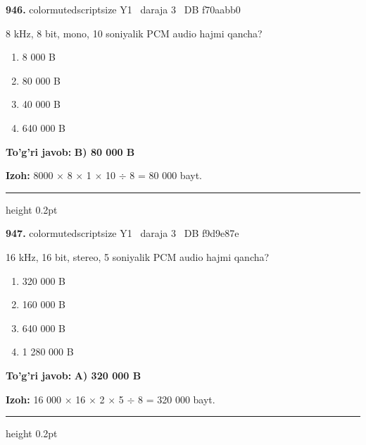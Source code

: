 \documentclass[10pt,a4paper,oneside]{article}
\begin{document}
\noindent\textbf{\color{ink}946.}  {color{muted}scriptsize Y1 \textbullet\ daraja 3 \textbullet\ DB f70aabb0}
\par
8 kHz, 8 bit, mono, 10 soniyalik PCM audio hajmi qancha?
\begin{enumerate}[label=\Alph*),leftmargin=9mm]
\item 8 000 B
\item 80 000 B
\item 40 000 B
\item 640 000 B
\end{enumerate}
\begin{tcolorbox}[enhanced,breakable,colback=teal!4,colframe=teal!50!black,boxrule=0.5pt,arc=1.1mm,left=3mm,right=3mm,top=1.7mm,bottom=1.7mm,before skip=2mm,after skip=2mm]
\textbf{\color{teal}To'g'ri javob:} \textbf{B) 80 000 B}
\par\smallskip
\textbf{Izoh:} 8000 \ensuremath{\times} 8 \ensuremath{\times} 1 \ensuremath{\times} 10 \ensuremath{\div} 8 = 80 000 bayt.
\end{tcolorbox}
\vspace{2mm}\hrule height 0.2pt \vspace{3mm}

\noindent\textbf{\color{ink}947.}  {color{muted}scriptsize Y1 \textbullet\ daraja 3 \textbullet\ DB f9d9e87e}
\par
16 kHz, 16 bit, stereo, 5 soniyalik PCM audio hajmi qancha?
\begin{enumerate}[label=\Alph*),leftmargin=9mm]
\item 320 000 B
\item 160 000 B
\item 640 000 B
\item 1 280 000 B
\end{enumerate}
\begin{tcolorbox}[enhanced,breakable,colback=teal!4,colframe=teal!50!black,boxrule=0.5pt,arc=1.1mm,left=3mm,right=3mm,top=1.7mm,bottom=1.7mm,before skip=2mm,after skip=2mm]
\textbf{\color{teal}To'g'ri javob:} \textbf{A) 320 000 B}
\par\smallskip
\textbf{Izoh:} 16 000 \ensuremath{\times} 16 \ensuremath{\times} 2 \ensuremath{\times} 5 \ensuremath{\div} 8 = 320 000 bayt.
\end{tcolorbox}
\vspace{2mm}\hrule height 0.2pt \vspace{3mm}
\end{document}
